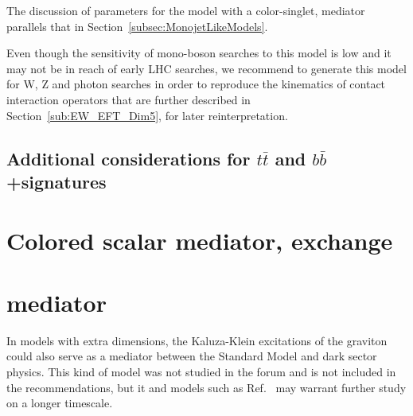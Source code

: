 The discussion of parameters for the model with a color-singlet, \spinzero mediator
parallels that in Section~\ref{subsec:MonojetLikeModels}. 

Even though the sensitivity of mono-boson searches to this model is low and it may not
be in reach of early LHC searches, we recommend to generate this model for W, Z and photon searches 
in order to reproduce the kinematics of contact interaction operators that are further 
described in Section~\ref{sub:EW_EFT_Dim5}, for later reinterpretation.  

%

\subsection{\texorpdfstring{Additional considerations for $t \bar{t}$ and $b \bar{b}$+\MET signatures}{Additional considerations for ttbar/bbbar+\MET signatures}}
\label{subsec:DMHFModels}



\section{Colored scalar mediator, \tchannel exchange}
\label{sec:monojet_t_channel}


\section{ \Spintwo mediator}
\label{sec:spintwo}

In models with extra dimensions, the Kaluza-Klein excitations of the graviton could also serve as a mediator between the Standard Model and dark sector physics. This kind of model was not studied in the forum and is not included in the recommendations, but it and models such as Ref.~\cite{Lee:2013bua} may warrant further study on a longer timescale. 


